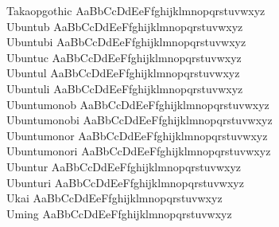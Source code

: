 \begin{tabbing}
Takaopgothic \> { AaBbCcDdEeFfghijklmnopqrstuvwxyz} \\
Ubuntub \> { AaBbCcDdEeFfghijklmnopqrstuvwxyz} \\
Ubuntubi \> { AaBbCcDdEeFfghijklmnopqrstuvwxyz} \\
Ubuntuc \> { AaBbCcDdEeFfghijklmnopqrstuvwxyz} \\
Ubuntul \> { AaBbCcDdEeFfghijklmnopqrstuvwxyz} \\
Ubuntuli \> { AaBbCcDdEeFfghijklmnopqrstuvwxyz} \\
Ubuntumonob \> { AaBbCcDdEeFfghijklmnopqrstuvwxyz} \\
Ubuntumonobi \> { AaBbCcDdEeFfghijklmnopqrstuvwxyz} \\
Ubuntumonor \> { AaBbCcDdEeFfghijklmnopqrstuvwxyz} \\
Ubuntumonori \> { AaBbCcDdEeFfghijklmnopqrstuvwxyz} \\
Ubuntur \> { AaBbCcDdEeFfghijklmnopqrstuvwxyz} \\
Ubunturi \> { AaBbCcDdEeFfghijklmnopqrstuvwxyz} \\
Ukai \> { AaBbCcDdEeFfghijklmnopqrstuvwxyz} \\
Uming \> { AaBbCcDdEeFfghijklmnopqrstuvwxyz} \\
\end{tabbing}



